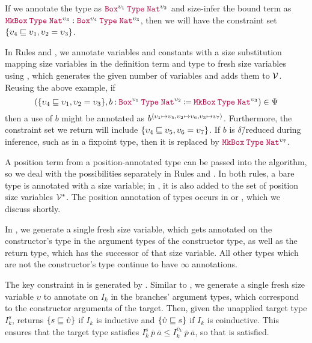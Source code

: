 If we annotate the type as $\app{\Box^{\upsilon_1}}{\Type{}}{\Nat^{\upsilon_2}}$ and size-infer the bound term as $\app{\MkBox}{\Type{}}{\Nat^{\upsilon_3}} : \app{\Box^{\upsilon_4}}{\Type{}}{\Nat^{\upsilon_3}}$, then we will have the constraint set \mbox{$\{\upsilon_4 \sqsubseteq \upsilon_1, \upsilon_2 = \upsilon_3\}$}.

In Rules  and ,
we annotate variables and constants with a size substitution mapping size variables in the definition term and type to fresh size variables using \fresh,
which generates the given number of variables and adds them to $\mathcal{V}$.
Reusing the above example, if
$$(\set{\upsilon_4 \sqsubseteq \upsilon_1, \upsilon_2 = \upsilon_3}, \defn{b}{\app{\Box^{\upsilon_1}}{\Type{}}{\Nat^{\upsilon_2}}}{\app{\MkBox}{\Type{}}{\Nat^{\upsilon_3}}}) \in \Psi$$
then a use of $b$ might be annotated as $b^{\langle\upsilon_1 \mapsto \upsilon_5, \upsilon_2 \mapsto \upsilon_6, \upsilon_3 \mapsto \upsilon_7\rangle}$.
Furthermore, the constraint set we return will include $\{\upsilon_4 \sqsubseteq \upsilon_5, \upsilon_6 = \upsilon_7\}$.
If $b$ is $\delta$\=/reduced during inference, such as in a fixpoint type, then it is replaced by $\app{\MkBox}{\Type{}}{\Nat^{\upsilon_7}}$.

A position term from a position-annotated \cofixpoint type can be passed into the algorithm, so we deal with the possibilities separately in Rules  and .
In both rules, a bare \coinductive type is annotated with a size variable; in , it is also added to the set of position size variables $\mathcal{V}^*$.
The position annotation of \coinductive types occurs in  or , which we discuss shortly.

In , we generate a single fresh size variable, which gets annotated on the constructor's \coinductive type in the argument types of the constructor type, as well as the return type, which has the successor of that size variable.
All other \coinductive types which are not the constructor's \coinductive type continue to have $\infty$ annotations.

The key constraint in  is generated by \casesize.
Similar to , we generate a single fresh size variable $\upsilon$ to annotate on $I_k$ in the branches' argument types, which correspond to the constructor arguments of the target.
Then, given the unapplied target type $I_k^s$, \casesize returns $\{s \sqsubseteq \hat{\upsilon}\}$ if $I_k$ is inductive and $\{\hat{\upsilon} \sqsubseteq s\}$ if $I_k$ is coinductive.
This ensures that the target type satisfies $I_k^s ~ \overline{p} ~ \overline{a} \leq I_k^{\hat{\upsilon}_k} ~ \overline{p} ~ \overline{a}$, so that  is satisfied.

